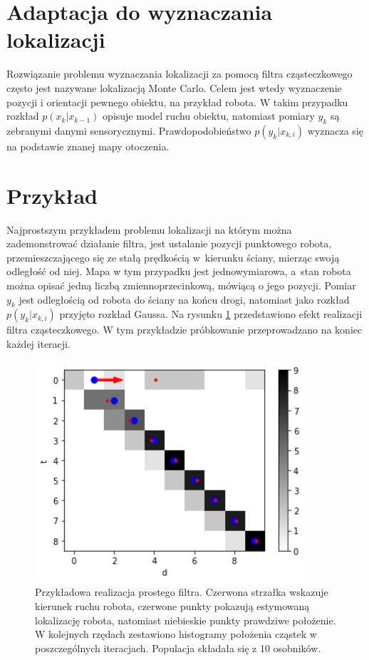 \section{Adaptacja do wyznaczania lokalizacji}
Rozwiązanie problemu wyznaczania lokalizacji za pomocą filtra cząsteczkowego często jest nazywane lokalizacją Monte Carlo. Celem jest wtedy wyznaczenie pozycji i orientacji pewnego obiektu, na przykład robota. W takim przypadku rozkład $p(x_k|x_{k-1})$ opisuje model ruchu obiektu, natomiast pomiary $y_k$ są zebranymi danymi sensorycznymi. Prawdopodobieństwo $p(y_k|x_{k,i})$ wyznacza się na podstawie znanej mapy otoczenia.

\section{Przykład}\label{simple_example_chap}
Najprostszym przykładem problemu lokalizacji na którym można zademonstrować działanie filtra, jest ustalanie pozycji punktowego robota, przemieszczającego się ze stałą prędkością w~kierunku ściany, mierząc swoją odległość od niej. Mapa w tym przypadku jest jednowymiarowa, a~stan robota można opisać jedną liczbą zmiennoprzecinkową, mówiącą o jego pozycji. Pomiar $y_k$ jest odległością od robota do ściany na końcu drogi, natomiast jako rozkład $p(y_k|x_{k,i})$ przyjęto rozkład Gaussa. Na rysunku \ref{simple_example} przedstawiono efekt realizacji filtra cząsteczkowego. W tym przykładzie próbkowanie przeprowadzano na koniec każdej iteracji.

\begin{figure}[H]
	\begin{center}
		\includegraphics[width=10cm]{./simple_example.png}
		\caption[Przykładowa realizacja prostego filtra.]{Przykładowa realizacja prostego filtra. Czerwona strzałka wskazuje kierunek ruchu robota, czerwone punkty pokazują estymowaną lokalizację robota, natomiast niebieskie punkty prawdziwe położenie. W kolejnych rzędach zestawiono histogramy położenia cząstek w poszczególnych iteracjach. Populacja składała się z 10 osobników.}\label{simple_example}
	\end{center}
\end{figure}

